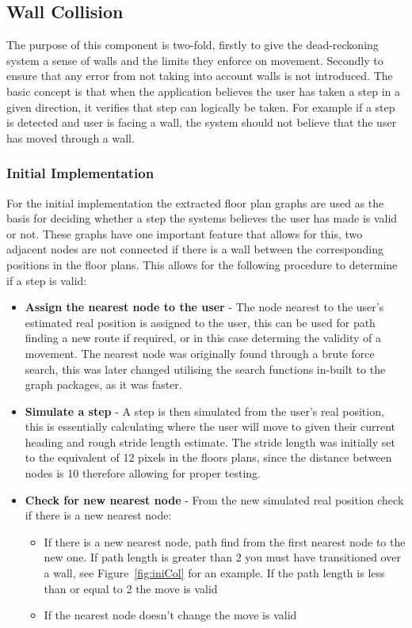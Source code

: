 \documentclass[main.tex]{subfiles}
\begin{document}
\subsection{Wall Collision}

The purpose of this component is two-fold, firstly to give the dead-reckoning system a sense of walls and the limits they enforce on movement. Secondly to ensure that any error from not taking into account walls is not introduced. The basic concept is that when the application believes the user has taken a step in a given direction, it verifies that step can logically be taken. For example if a step is detected and user is facing a wall, the system should not believe that the user has moved through a wall.

\subsubsection{Initial Implementation}

For the initial implementation the extracted floor plan graphs are used as the basis for deciding whether a step the systems believes the user has made is valid or not. These graphs have one important feature that allows for this, two adjacent nodes are not connected if there is a wall between the corresponding positions in the floor plans. This allows for the following procedure to determine if a step is valid:

\begin{itemize}
	\item \textbf{Assign the nearest node to the user} - The node nearest to the user's estimated real position is assigned to the user, this can be used for path finding a new route if required, or in this case determing the validity of a movement. The nearest node was originally found through a brute force search, this was later changed utilising the search functions in-built to the graph packages, as it was faster.
	\item \textbf{Simulate a step} - A step is then simulated from the user's real position, this is essentially calculating where the user will move to given their current heading and rough stride length estimate. The stride length was initially set to the equivalent of 12 pixels in the floors plans, since the distance between nodes is 10 therefore allowing for proper testing. 
	\item \textbf{Check for new nearest node} - From the new simulated real position check if there is a new nearest node:
	\begin{itemize}
		\item If there is a new nearest node, path find from the first nearest node to the new one. If path length is greater than 2 you must have transitioned over a wall, see Figure~\ref{fig:iniCol} for an example. If the path length is less than or equal to 2 the move is valid
		\item If the nearest node doesn't change the move is valid
	\end{itemize}
\end{itemize}
\end{document}
